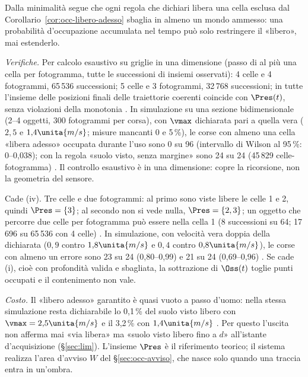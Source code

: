 Dalla minimalità segue che ogni regola che dichiari libera una cella esclusa dal Corollario~\ref{cor:occ-libero-adesso} sbaglia in almeno un mondo ammesso: una probabilità d'occupazione accumulata nel tempo può solo restringere il «libero», mai estenderlo.

\emph{Verifiche.} Per calcolo esaustivo su griglie in una dimensione (passo di al più una cella per fotogramma, tutte le successioni di insiemi osservati): 4 celle e 4 fotogrammi, 65\,536 successioni; 5 celle e 3 fotogrammi, 32\,768 successioni; in tutte l'insieme delle posizioni finali delle traiettorie coerenti coincide con $\Pres(t)$, senza violazioni della monotonia . In simulazione su una sezione bidimensionale (2--4 oggetti, 300 fotogrammi per corsa), con $\vmax$ dichiarata pari a quella vera ($2{,}5$ e $1{,}4\unita{m/s}$; misure mancanti 0 e 5\,\%), le corse con almeno una cella «libera adesso» occupata durante l'uso sono 0 su 96 (intervallo di Wilson al 95\,\%: 0--0,038); con la regola «suolo visto, senza margine» sono 24 su 24 (45\,829 celle-fotogramma) . Il controllo esaustivo è in una dimensione: copre la ricorsione, non la geometria del sensore.

\begin{controesempio}\label{ce:occ-velocita}
Cade (iv). Tre celle e due fotogrammi: al primo sono viste libere le celle 1 e 2, quindi $\Pres=\{3\}$; al secondo non si vede nulla, $\Pres=\{2,3\}$; un oggetto che percorre due celle per fotogramma può essere nella cella 1 (8 successioni su 64; 17\,696 su 65\,536 con 4 celle) . In simulazione, con velocità vera doppia della dichiarata ($0{,}9$ contro $1{,}8\unita{m/s}$ e $0{,}4$ contro $0{,}8\unita{m/s}$), le corse con almeno un errore sono 23 su 24 (0,80--0,99) e 21 su 24 (0,69--0,96) . Se cade (i), cioè con profondità valida e sbagliata, la sottrazione di $\Oss(t)$ toglie punti occupati e il contenimento non vale.
\end{controesempio}

\emph{Costo.} Il «libero adesso» garantito è quasi vuoto a passo d'uomo: nella stessa simulazione resta dichiarabile lo 0,1\,\% del suolo visto libero con $\vmax=2{,}5\unita{m/s}$ e il 3,2\,\% con $1{,}4\unita{m/s}$ . Per questo l'uscita non afferma mai «via libera» ma «suolo visto libero fino a $d$» all'istante d'acquisizione (\S\ref{sec:lim}). L'insieme $\Pres$ è il riferimento teorico; il sistema realizza l'area d'avviso $W$ del \S\ref{sec:occ-avviso}, che nasce solo quando una traccia entra in un'ombra.

